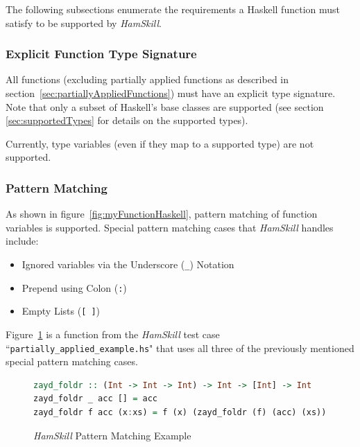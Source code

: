 \documentclass{report}
\begin{document}
The following subsections enumerate the requirements a Haskell function must satisfy to be supported by \textit{HamSkill}.

\subsubsection{Explicit Function Type Signature}\label{sec:explicitTypeSignature}

All functions (excluding partially applied functions as described in section~\ref{sec:partiallyAppliedFunctions}) must have an explicit type signature.  Note that only a subset of Haskell's base classes are supported (see section \ref{sec:supportedTypes} for details on the supported types).  

Currently, type variables (even if they map to a supported type) are not supported.

\subsubsection{Pattern Matching}\label{sec:supportedPatternMatching}

As shown in figure~\ref{fig:myFunctionHaskell}, pattern matching of function variables is supported.  Special pattern matching cases that \textit{HamSkill} handles include:

\begin{itemize}

\item Ignored variables via the Underscore (\texttt{\_}) Notation

\item Prepend using Colon (\texttt{:})

\item Empty Lists (\texttt{[ ]})

\end{itemize}

Figure~\ref{fig:functionZaydFoldr} is a function from the \textit{HamSkill} test case ``\texttt{partially\_applied\_example.hs}" that uses all three of the previously mentioned special pattern matching cases.

\begin{figure}[H]
\begin{mdframed}
\begin{lstlisting}[basicstyle=\small, language=Haskell]
zayd_foldr :: (Int -> Int -> Int) -> Int -> [Int] -> Int
zayd_foldr _ acc [] = acc
zayd_foldr f acc (x:xs) = f (x) (zayd_foldr (f) (acc) (xs))
\end{lstlisting}
\end{mdframed}
\caption{\textit{HamSkill} Pattern Matching Example}\label{fig:functionZaydFoldr}
\end{figure}
\end{document}
